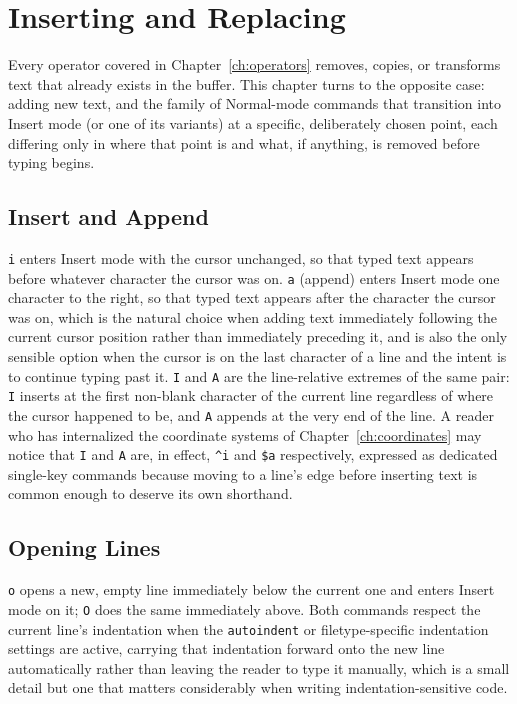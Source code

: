 \chapter{Inserting and Replacing}
\label{ch:insert}

Every operator covered in Chapter~\ref{ch:operators} removes, copies, or transforms text that already exists in the buffer. This chapter turns to the opposite case: adding new text, and the family of Normal-mode commands that transition into Insert mode (or one of its variants) at a specific, deliberately chosen point, each differing only in where that point is and what, if anything, is removed before typing begins.

\section{Insert and Append}

\texttt{i} enters Insert mode with the cursor unchanged, so that typed text appears before whatever character the cursor was on. \texttt{a} (append) enters Insert mode one character to the right, so that typed text appears after the character the cursor was on, which is the natural choice when adding text immediately following the current cursor position rather than immediately preceding it, and is also the only sensible option when the cursor is on the last character of a line and the intent is to continue typing past it. \texttt{I} and \texttt{A} are the line-relative extremes of the same pair: \texttt{I} inserts at the first non-blank character of the current line regardless of where the cursor happened to be, and \texttt{A} appends at the very end of the line. A reader who has internalized the coordinate systems of Chapter~\ref{ch:coordinates} may notice that \texttt{I} and \texttt{A} are, in effect, \texttt{\^{}i} and \texttt{\$a} respectively, expressed as dedicated single-key commands because moving to a line's edge before inserting text is common enough to deserve its own shorthand.

\section{Opening Lines}

\texttt{o} opens a new, empty line immediately below the current one and enters Insert mode on it; \texttt{O} does the same immediately above. Both commands respect the current line's indentation when the \texttt{autoindent} or filetype-specific indentation settings are active, carrying that indentation forward onto the new line automatically rather than leaving the reader to type it manually, which is a small detail but one that matters considerably when writing indentation-sensitive code.

